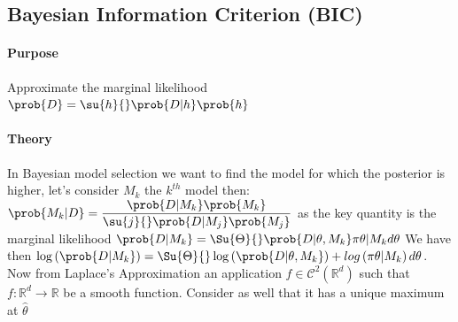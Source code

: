 \subsection{Bayesian Information Criterion (BIC)}
\paragraph{Purpose}
Approximate the marginal likelihood $\prob{D} = \su{h}{}\prob{D|h}\prob{h}$
\paragraph{Theory}
In Bayesian model selection we want to find the model for which the posterior is higher, let's
consider $M_{k}$ the $k^{th}$ model then: 
$\prob{M_{k}|D} = \dfrac{\prob{D|M_{k}}\prob{M_{k}}}{\su{j}{}\prob{D|M_{j}}\prob{M_{j}}}$
as the key quantity is the marginal likelihood $\prob{D|M_{k}} = \Su{\Theta}{}\prob{D|\theta, M_{k}}\pi{\theta|M_{k}}d\theta$
We have then $\log\left(\prob{D|M_{k}}\right) = \Su{\Theta}{}\log\left(\prob{D|\theta, M_{k}}\right) + log\left(\pi{\theta|M_{k}}\right)d\theta$.
Now from Laplace's Approximation an application $f\in\mathcal{C}^{2}\left(\mathbb{R}^{d}\right)$ such that $f: \mathbb{R}^{d} \longrightarrow \mathbb{R}$ be a smooth function. Consider as well that it has a unique maximum at $\hat{\theta}$


